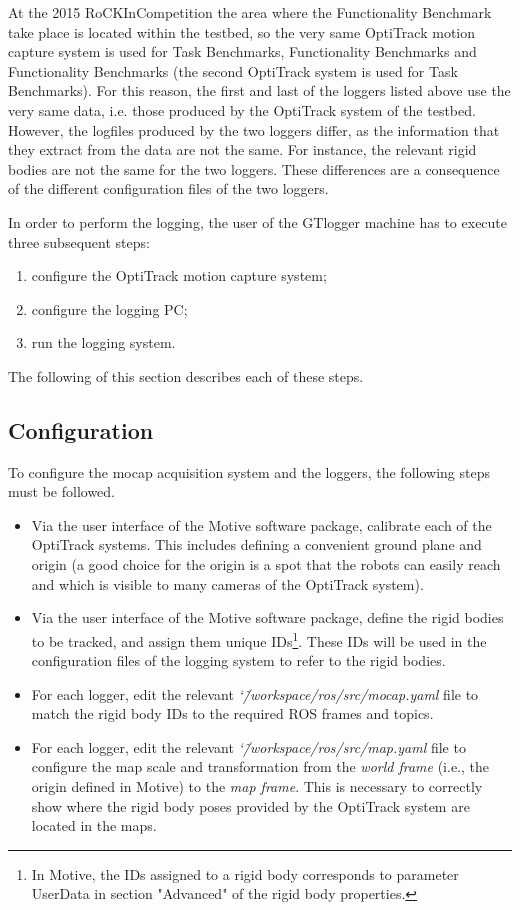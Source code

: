 \documentclass[a4paper]{article}
\newcommand{\ro}{RoCKIn}
\newcommand{\srcdir}{\char`\~/workspace/ros/src/}
\begin{document}
At the 2015 \ro Competition the area where the Functionality Benchmark take place is located within the \ro@Home testbed, so the very same OptiTrack motion capture system is used for \ro@Home Task Benchmarks, \ro@Home Functionality Benchmarks and \ro@Work Functionality Benchmarks (the second OptiTrack system is used for \ro@Work Task Benchmarks). For this reason,  the first and last of the loggers listed above use the very same data, i.e. those produced by the OptiTrack system of the \ro@Home testbed. However, the logfiles produced by the two loggers differ, as the information that they extract from the data are not the same. For instance, the relevant rigid bodies are not the same for the two loggers. These differences are a consequence of the different configuration files of the two loggers.

In order to perform the logging, the user of the GTlogger machine has to execute three subsequent steps:
\begin{enumerate}
\item configure the OptiTrack motion capture system;
\item configure the logging PC;
\item run the logging system.
\end{enumerate}

The following of this section describes each of these steps.

\subsection{Configuration}

To configure the mocap acquisition system and the loggers, the following steps must be followed.
\begin{itemize}
  \item Via the user interface of the Motive software package, calibrate each of the OptiTrack systems. This includes defining a convenient ground plane and origin (a good choice for the origin is a spot that the robots can easily reach and which is visible to many cameras of the OptiTrack system).
  \item Via the user interface of the Motive software package, define the rigid bodies to be tracked, and assign them unique IDs\footnote{In Motive, the IDs assigned to a rigid body corresponds to parameter UserData in section "Advanced" of the rigid body properties.}. These IDs will be used in the configuration files of the logging system to refer to the rigid bodies.
  \item For each logger, edit the relevant \emph{\srcdir mocap.yaml} file to match the rigid body IDs to the required ROS frames and topics.
  \item For each logger, edit the relevant \emph{\srcdir map.yaml} file to configure the map scale and transformation from the \emph{world frame} (i.e., the origin defined in Motive) to the \emph{map frame}. This is necessary to correctly show where the rigid body poses provided by the OptiTrack system are located in the maps.
\end{itemize}
\end{document}
